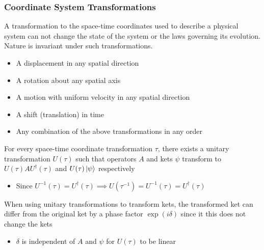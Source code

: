 \documentclass[8pt,t,mathserif,aspectratio=169]{beamer}
\begin{document}
\begin{frame}
  \frametitle{Coordinate System Transformations}
  \vspace{1mm}
  A transformation to the space-time coordinates used to describe a physical system can not change the state of the system or the laws governing its evolution. Nature is invariant under such transformations.
  \begin{itemize}
    \item A displacement in any spatial direction
    \item A rotation about any spatial axis
    \item A motion with uniform velocity in any spatial direction
    \item A shift (translation) in time
    \item Any combination of the above transformations in any order
  \end{itemize}
  For every space-time coordinate transformation $\tau$, there exists a unitary transformation $U(\tau)$ such that operators $A$ and kets $\psi$ transform to $U(\tau) A U^{\dagger}(\tau)$ and $U(\tau) \ket{\psi}$ respectively
  \begin{itemize}
    \item Since $U^{-1}(\tau) = U^{\dagger}(\tau) \implies U(\tau^{-1}) = U^{-1}(\tau) = U^{\dagger}(\tau)$
  \end{itemize}
  When using unitary transformations to transform kets, the transformed ket can differ from the original ket by a phase factor $\exp(i \delta)$ since it this does not change the kets 
  \begin{itemize}
    \item $\delta$ is independent of $A$ and $\psi$ for $U(\tau)$ to be linear
  \end{itemize}
\end{frame}
\end{document}
